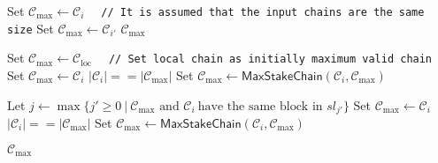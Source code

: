 \begin{algorithm}[ht]
    \begin{algorithmic}[1]
        \caption{${\textsf{MaxStakeChain}(\mathcal{C}_i}, \mathcal{C}_{i'})$}
            \State Set ${\mathcal{C}_{\max} \leftarrow \mathcal{C}_{i}}$
        \Else
            \lstinline|  // It is assumed that the input chains are the same size|
            \State Set ${\mathcal{C}_{\max} \leftarrow \mathcal{C}_{i'}}$
        \EndIf
        \State \Return ${\mathcal{C}_{\max}}$
    \end{algorithmic}\label{alg:algorithm-01}
\end{algorithm}

\begin{algorithm}[ht]
    \begin{algorithmic}[1]
        \caption{${\textsf{MaxValidChain}(\mathcal{C}_{\text{loc}}, C_{\text{set}} = \{\mathcal{C}_i\}_{i=1}^N, K_{\text{f}}, S_{\text{g}})}$}
        \State Set ${\mathcal{C}_{\max} \leftarrow \mathcal{C}_{\text{loc}}}$
        \lstinline|  // Set local chain as initially maximum valid chain|
        \For {${i = 1 \dots N}$}
                \If {$|\mathcal{C}_i| > |\mathcal{C}_{\max}|$}
                    \State Set ${\mathcal{C}_{\max} \leftarrow \mathcal{C}_{i}}$
                \ElsIf
                        {$|\mathcal{C}_i| == |\mathcal{C}_{\max}|$}
                    \State Set ${\mathcal{C}_{\max} \leftarrow \textsf{MaxStakeChain}(\mathcal{C}_{i}, \mathcal{C}_{\max})}$

                \EndIf
            \Else

                \State Let ${j  \leftarrow \max \{j' \geq 0 \ |\  \mathcal{C}_{\max} \text{ and } \mathcal{C}_{i} \
                \text{have the same block in } sl_{j'}\}}$
                \If {$|\mathcal{C}_i[j: j + S_{\text{g}}]| > |\mathcal{C}_{\max}[j: j + S_{\text{g}}]|$}
                    \State Set ${\mathcal{C}_{\max} \leftarrow \mathcal{C}_{i}}$
                \ElsIf
                        {$|\mathcal{C}_i| == |\mathcal{C}_{\max}|$}
                    \State Set ${\mathcal{C}_{\max} \leftarrow \textsf{MaxStakeChain}(\mathcal{C}_{i}, \mathcal{C}_{\max})}$
                \EndIf
            \EndIf

        \EndFor
        \State \Return ${\mathcal{C}_{\max}}$
    \end{algorithmic}\label{alg:algorithm-1}
\end{algorithm}


